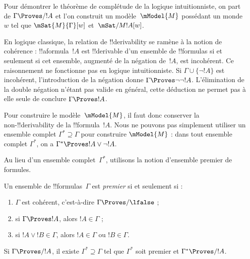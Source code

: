 \documentclass[../../../include/open-logic-section]{subfiles}
\begin{document}


Pour démontrer le théorème de complétude de la logique intuitionniste,
on part de $\Gamma \Proves/ !A$ et l'on construit un modèle~$\mModel{M}$
possédant un monde~$w$ tel que $\mSat{M}{\Gamma}[w]$
et~$\mSat/{M}{!A}[w]$.

En logique classique, la relation de !!{derivability} se ramène à la
notion de cohérence : !!a{formula}~$!A$ est !!{derivable} d'un
ensemble de !!{formula}s si et seulement si cet ensemble, augmenté
de la négation de~$!A$, est incohérent. Ce raisonnement ne fonctionne
pas en logique intuitionniste. Si $\Gamma \cup \{\lnot !A\}$
est incohérent, l'introduction de la négation donne
$\Gamma \Proves \lnot\lnot !A$. L'élimination de la double
négation n'étant pas valide en général, cette déduction ne
permet pas à elle seule de conclure $\Gamma \Proves !A$.

Pour construire le modèle~$\mModel{M}$, il faut donc conserver la
non-!!{derivability} de la !!{formula}~$!A$. Nous ne pouvons pas
simplement utiliser un ensemble complet
$\Gamma^* \supseteq \Gamma$ pour construire $\mModel{M}$ : dans tout ensemble complet
$\Gamma^*$, on a $\Gamma^* \Proves !A \lor \lnot !A$.

Au lieu d'un ensemble complet~$\Gamma^*$, utilisons la notion
d'ensemble premier de formules.

\begin{defn}
  Un ensemble de !!{formula}s~$\Gamma$ est \emph{premier} si et
  seulement si :
  \begin{enumerate}
  \item{} $\Gamma$ est cohérent, c'est-à-dire
    $\Gamma \Proves/ \lfalse$ ;
  \item{} si $\Gamma \Proves !A$, alors
    $!A \in \Gamma$ ;
  \item{} si $!A \lor !B \in \Gamma$, alors
    $!A \in \Gamma$ ou $!B \in \Gamma$.
  \end{enumerate}
\end{defn}

\begin{lem}
   Si $\Gamma \Proves/ !A$, il existe
  $\Gamma^* \supseteq \Gamma$ tel que $\Gamma^*$ soit premier et
  $\Gamma^* \Proves/ !A$.
\end{lem}
\end{document}
